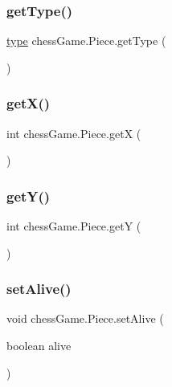 \subsubsection{\texorpdfstring{get\+Type()}{getType()}}
{\footnotesize\ttfamily \hyperlink{classchess_game_1_1_piece_a1370c7f61581a1b72fa8ac2fd1af70a2}{type} chess\+Game.\+Piece.\+get\+Type (\begin{DoxyParamCaption}{ }\end{DoxyParamCaption})}

\hypertarget{classchess_game_1_1_piece_a7edc54b17ccd974a8039bfc701e4077a}{}\label{classchess_game_1_1_piece_a7edc54b17ccd974a8039bfc701e4077a} 
\subsubsection{\texorpdfstring{get\+X()}{getX()}}
{\footnotesize\ttfamily int chess\+Game.\+Piece.\+getX (\begin{DoxyParamCaption}{ }\end{DoxyParamCaption})}

\hypertarget{classchess_game_1_1_piece_acce32235b9e4d7aaf3a8459076b275e1}{}\label{classchess_game_1_1_piece_acce32235b9e4d7aaf3a8459076b275e1} 
\subsubsection{\texorpdfstring{get\+Y()}{getY()}}
{\footnotesize\ttfamily int chess\+Game.\+Piece.\+getY (\begin{DoxyParamCaption}{ }\end{DoxyParamCaption})}

\hypertarget{classchess_game_1_1_piece_af3f395afe64554bc7160c92981de2434}{}\label{classchess_game_1_1_piece_af3f395afe64554bc7160c92981de2434} 
\subsubsection{\texorpdfstring{set\+Alive()}{setAlive()}}
{\footnotesize\ttfamily void chess\+Game.\+Piece.\+set\+Alive (\begin{DoxyParamCaption}\item[{boolean}]{alive }\end{DoxyParamCaption})}


